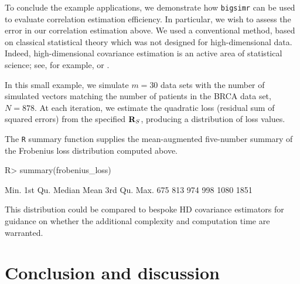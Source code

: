 \documentclass[
]{jss}
\begin{document}
To conclude the example applications, we demonstrate how
\texttt{bigsimr} can be used to evaluate correlation estimation
efficiency. In particular, we wish to assess the error in our
correlation estimation above. We used a conventional method, based on
classical statistical theory which was not designed for high-dimensional
data. Indeed, high-dimensional covariance estimation is an active area
of statistical science; see, for example, \citet{Won2013g} or
\citet{VanWieringen2016}.

In this small example, we simulate \(m=30\) data sets with the number of
simulated vectors matching the number of patients in the BRCA data set,
\(N=878\). At each iteration, we estimate the quadratic loss (residual
sum of squared errors) from the specified \({\bf R}_{S}\), producing a
distribution of loss values.

\begin{CodeChunk}
\end{CodeChunk}

The \texttt{R} summary function supplies the mean-augmented five-number
summary of the Frobenius loss distribution computed above.

\begin{CodeChunk}
\begin{CodeInput}
R> summary(frobenius_loss)
\end{CodeInput}
\begin{CodeOutput}
   Min. 1st Qu.  Median    Mean 3rd Qu.    Max. 
    675     813     974     998    1080    1851 
\end{CodeOutput}
\end{CodeChunk}

This distribution could be compared to bespoke HD covariance estimators
for guidance on whether the additional complexity and computation time
are warranted.

\hypertarget{discussion}{%
\section{Conclusion and discussion}\label{discussion}}
\end{document}
